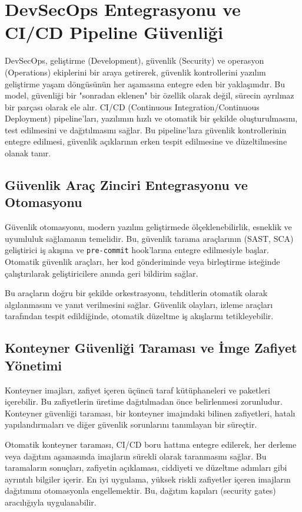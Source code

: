 \section{DevSecOps Entegrasyonu ve CI/CD Pipeline Güvenliği}

DevSecOps, geliştirme (Development), güvenlik (Security) ve operasyon (Operations) ekiplerini bir araya getirerek, güvenlik kontrollerini yazılım geliştirme yaşam döngüsünün her aşamasına entegre eden bir yaklaşımdır. Bu model, güvenliği bir "sonradan eklenen" bir özellik olarak değil, sürecin ayrılmaz bir parçası olarak ele alır. CI/CD (Continuous Integration/Continuous Deployment) pipeline'ları, yazılımın hızlı ve otomatik bir şekilde oluşturulmasını, test edilmesini ve dağıtılmasını sağlar. Bu pipeline'lara güvenlik kontrollerinin entegre edilmesi, güvenlik açıklarının erken tespit edilmesine ve düzeltilmesine olanak tanır.

\subsection{Güvenlik Araç Zinciri Entegrasyonu ve Otomasyonu}

Güvenlik otomasyonu, modern yazılım geliştirmede ölçeklenebilirlik, esneklik ve uyumluluk sağlamanın temelidir. Bu, güvenlik tarama araçlarının (SAST, SCA) geliştirici iş akışına ve \texttt{pre-commit} hook'larına entegre edilmesiyle başlar. Otomatik güvenlik araçları, her kod gönderiminde veya birleştirme isteğinde çalıştırılarak geliştiricilere anında geri bildirim sağlar.

Bu araçların doğru bir şekilde orkestrasyonu, tehditlerin otomatik olarak algılanmasını ve yanıt verilmesini sağlar. Güvenlik olayları, izleme araçları tarafından tespit edildiğinde, otomatik düzeltme iş akışlarını tetikleyebilir.

\subsection{Konteyner Güvenliği Taraması ve İmge Zafiyet Yönetimi}

Konteyner imajları, zafiyet içeren üçüncü taraf kütüphaneleri ve paketleri içerebilir. Bu zafiyetlerin üretime dağıtılmadan önce belirlenmesi zorunludur. Konteyner güvenliği taraması, bir konteyner imajındaki bilinen zafiyetleri, hatalı yapılandırmaları ve diğer güvenlik sorunlarını tanımlayan bir süreçtir.

Otomatik konteyner taraması, CI/CD boru hattına entegre edilerek, her derleme veya dağıtım aşamasında imajların sürekli olarak taranmasını sağlar. Bu taramaların sonuçları, zafiyetin açıklaması, ciddiyeti ve düzeltme adımları gibi ayrıntılı bilgiler içerir. En iyi uygulama, yüksek riskli zafiyetler içeren imajların dağıtımını otomasyonla engellemektir. Bu, dağıtım kapıları (security gates) aracılığıyla uygulanabilir.

